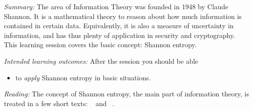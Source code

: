 \emph{Summary:}
The area of Information Theory was founded in 1948 by Claude Shannon.
It is a mathematical theory to reason about how much information is contained 
in certain data.
Equivalently, it is also a measure of uncertainty in information, and has thus 
plenty of application in security and cryptography.
This learning session covers the basic concept: Shannon entropy.

\emph{Intended learning outcomes:}
After the session you should be able
\begin{itemize}
  \item to \emph{apply} Shannon entropy in basic situations.
\end{itemize}

\emph{Reading:}
The concept of Shannon entropy, the main part of information theory, is treated 
in a few short texts:
~\cite{Eckersley2010apo} and
~\cite{Ueltschi2013se}.
